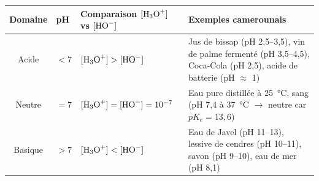 \documentclass[11pt]{article}
\begin{document}
\begin{propriete}
\begin{center}
\begin{tabularx}{\linewidth}{|c|X|X|X|}
\hline
\rowcolor{popblueL}
\textbf{Domaine} & \textbf{pH} & \textbf{Comparaison $[\ce{H3O+}]$ vs $[\ce{HO-}]$} & \textbf{Exemples camerounais} \\
\hline
Acide & $< 7$ & $[\ce{H3O+}] > [\ce{HO-}]$ & Jus de bissap (pH 2,5--3,5), vin de palme fermenté (pH 3,5--4,5), Coca-Cola (pH 2,5), acide de batterie (pH $\approx$ 1) \\
\hline
Neutre & $= 7$ & $[\ce{H3O+}] = [\ce{HO-}] = 10^{-7}$ & Eau pure distillée à \SI{25}{\celsius}, sang (pH 7,4 à \SI{37}{\celsius} $\to$ neutre car $pK_e=13,6$) \\
\hline
Basique & $> 7$ & $[\ce{H3O+}] < [\ce{HO-}]$ & Eau de Javel (pH 11--13), lessive de cendres (pH 10--11), savon (pH 9--10), eau de mer (pH 8,1) \\
\hline
\end{tabularx}
\end{center}
\end{propriete}
\end{document}

